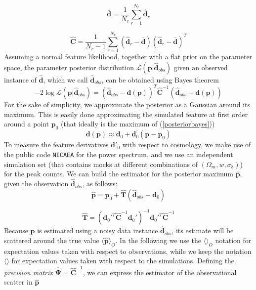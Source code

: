 \documentclass[reprint,aps,prd,superscriptaddress,showkeys,showpacs]{revtex4-1}
\newcommand{\bb}[1]{\mathbf{#1}}
\newcommand{\bbh}[1]{\mathbf{\hat{#1}}}
\begin{document}
\begin{equation}
\bb{\bar{d}} = \frac{1}{N_r}\sum_{r=1}^{N_r} \bbh{d}_r
\end{equation}

\begin{equation}
\label{covest}
\bbh{C} = \frac{1}{N_r-1}\sum_{r=1}^{N_r} (\bbh{d}_r - \bar{\bb{d}}) (\bbh{d}_r - \bar{\bb{d}})^T
\end{equation}
%
Assuming a normal feature likelihood, together with a flat prior on the parameter space, the parameter posterior distribution $\mathcal{L}(\bb{p}\vert\bbh{d}_{obs})$ given an observed instance of $\bbh{d}$, which we call $\bbh{d}_{obs}$, can be obtained using Bayes theorem
\begin{equation}
\label{posteriorbayes}
-2\log\mathcal{L}(\bb{p}\vert\bbh{d}_{obs}) = (\bbh{d}_{obs}-\bb{d}(\bb{p}))^T\bbh{C}^{-1}(\bbh{d}_{obs}-\bb{d}(\bb{p}))
\end{equation}
%
For the sake of simplicity, we approximate the posterior as a Gaussian around its maximum. This is easily done approximating the simulated feature at first order around a point $\bb{p}_0$ (that ideally is the maximum of (\ref{posteriorbayes}))
\begin{equation}
\bb{d}(\bb{p}) \approx \bb{d}_0 + \bb{d}_0^\prime(\bb{p}-\bb{p}_0) 
\end{equation}
%
To measure the feature derivatives $\bb{d}'_0$ with respect to cosmology, we make use of the public code \texttt{NICAEA} \citep{Nicaea} for the power spectrum, and we use an independent simulation set (that contains mocks at different combinations of $(\Omega_m,w,\sigma_8)$) for the peak counts.
We can build the estimator for the posterior maximum $\bbh{p}$, given the observation $\bbh{d}_{obs}$, as follows:
%
\begin{equation}
\label{estimatormean}
\bbh{p} = \bb{p}_0 + \bbh{T}(\bbh{d}_{obs}-\bb{d}_0)
\end{equation}

\begin{equation}
\bbh{T} = (\bb{d}_0'^T\bbh{C}^{-1}\bb{d}_0')^{-1}\bb{d}_0'^T\bbh{C}^{-1}
\end{equation}
%
Because $\bbh{p}$ is estimated using a noisy data instance $\bbh{d}_{obs}$, its estimate will be scattered around the true value $\langle\bbh{p}\rangle_O$. In the following we use the $\langle\rangle_O$ notation for expectation values taken with respect to observations, while we keep the notation $\langle\rangle$ for expectation values taken with respect to the simulations. Defining the \textit{precision matrix} $\bbh{\Psi}=\bbh{C}^{-1}$, we can express the estimator of the observational scatter in $\bbh{p}$
\end{document}
